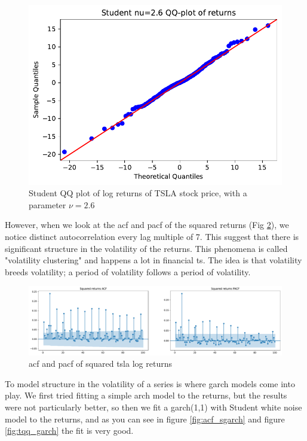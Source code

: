 \begin{figure}
	\centering
	\includegraphics[width=\textwidth]{img/img_tqq_returns.pdf}
	\caption{Student QQ plot of log returns of TSLA stock price, with a parameter $\nu=2.6$}
	\label{fig:tqq_returns}
\end{figure}

However, when we look at the \acrshort{acf} and \acrshort{pacf} of the squared returns (Fig \ref{fig:acf_sreturns}), we notice distinct autocorrelation every lag multiple of 7. This suggest that there is significant structure in the volatility of the returns. This phenomena is called "volatility clustering" and happens a lot in financial \acrlong{ts}. The idea is that volatility breeds volatility; a period of volatility follows a period of volatility. 

\begin{figure}
	\centering
	\includegraphics[width=\textwidth]{img/img_sreturns.pdf}
	\caption{\acrshort{acf} and \acrshort{pacf} of squared \acrshort{tsla} log returns}
	\label{fig:acf_sreturns}
\end{figure}

To model structure in the volatility of a series is where \acrshort{garch} models come into play. We first tried fitting a simple \acrshort{arch} model to the returns, but the results were not particularly better, so then we fit a \acrshort{garch}(1,1) with Student white noise model to the returns, and as you can see in figure \ref{fig:acf_sgarch} and figure \ref{fig:tqq_garch} the fit is very good.

